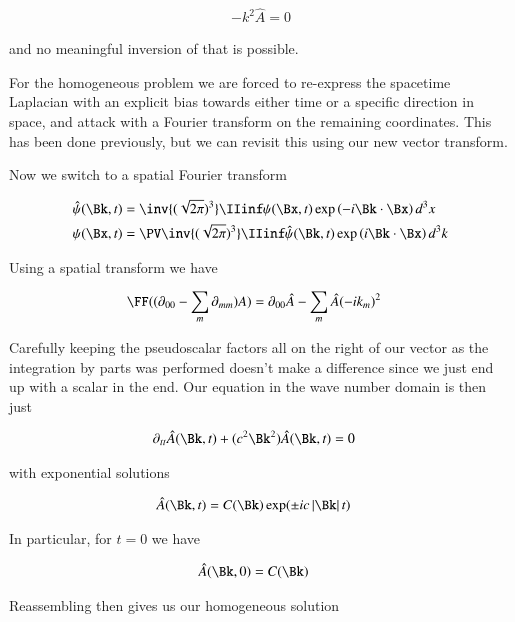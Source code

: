 \begin{align*}
-k^2 \hat{A} = 0
\end{align*}

and no meaningful inversion of that is possible.

For the homogeneous problem we are forced to re-express the spacetime Laplacian with an explicit bias towards either time or a specific direction in space, and attack with a Fourier transform on the remaining coordinates.  This has been done previously, but we can
revisit this using our new vector transform.

Now we switch to a spatial Fourier transform

\begin{align}\label{eqn:4d_fourier:3DFourierTxDefinition}
\hat{\psi}(\Bk, t) &= \inv{(\sqrt{2\pi})^3} \IIinf \psi(\Bx, t) \exp\left( -i \Bk \cdot \Bx \right) d^3 x \\
{\psi}(\Bx, t) &= \PV \inv{(\sqrt{2\pi})^3} \IIinf \hat{\psi}(\Bk, t) \exp\left( i \Bk \cdot \Bx \right) d^3 k
\end{align}

Using a spatial transform we have

\begin{align*}
\FF((\partial_{00} - \sum_m \partial_{mm}) A)
&= \partial_{00} \hat{A} - \sum_m \hat{A} (-i k_m)^2 
\end{align*}

Carefully keeping the pseudoscalar factors all on the right of our vector as the integration by parts was performed doesn't make a difference since we just end up with a scalar in the end.  Our equation in the wave number domain is then just

\begin{align*}
\partial_{tt} \hat{A}(\Bk,t) + (c^2 \Bk^2) \hat{A}(\Bk,t) &= 0 %
\end{align*}

with exponential solutions

\begin{align*}
\hat{A}(\Bk, t) &= C(\Bk) \exp(\pm i c \Abs{\Bk} t)
\end{align*}

In particular, for $t = 0$ we have

\begin{align*}
\hat{A}(\Bk, 0) &= C(\Bk)
\end{align*}

Reassembling then gives us our homogeneous solution

